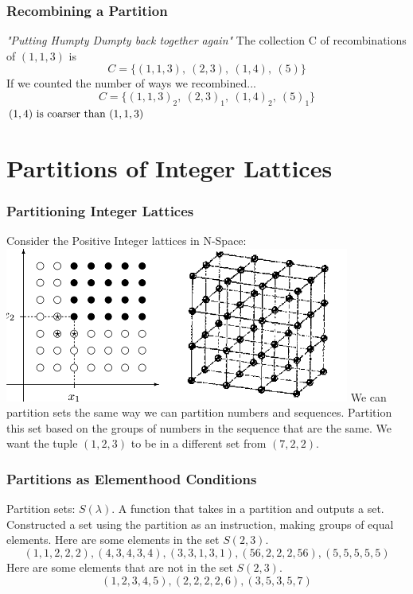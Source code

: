 \documentclass{beamer}
\begin{document}
\begin{frame}
\frametitle{Recombining a Partition}
\textit{"Putting Humpty Dumpty back together again"}
\newline \newline
The collection C of recombinations of \((1,1,3)\) is
\[C = \{(1,1,3),\ (2,3),\ (1,4),\ (5)\}\]
\newline
If we counted the number of ways we recombined...
\[C = \{(1,1,3)_2,\ (2,3)_1,\ (1,4)_2,\ (5)_1\}\]
\newline
\newline
\((1,4) \textup{ is coarser than } (1,1,3)\)
\end{frame}

\section{Partitions of Integer Lattices}

\begin{frame}
  \frametitle{Partitioning Integer Lattices}
  Consider the Positive Integer lattices in N-Space:
  \includegraphics{lattices}
  \newline
  We can partition sets the same way we can partition numbers and sequences.
  \newline \newline
  Partition this set based on the groups of numbers in the sequence that are the same.
  \newline \newline
  We want the tuple \((1,2,3)\) to be in a different set from \((7,2,2)\).
\end{frame}

\begin{frame}
  \frametitle{Partitions as Elementhood Conditions}
  Partition sets: \(S(\lambda)\).
  \newline \newline
  A function that takes in a partition and outputs a set.
  \newline \newline
  Constructed a set using the partition as an instruction, making groups of equal elements.
  \newline \newline
  Here are some elements in the set \(S(2,3)\).
  \[(1,1,2,2,2), (4,3,4,3,4), (3,3,1,3,1), (56, 2, 2, 2, 56), (5,5,5,5,5)\]
  Here are some elements that are not in the set \(S(2,3)\).
  \[(1,2,3,4,5), (2,2,2,2,6), (3,5,3,5,7)\]
\end{frame}
\end{document}

